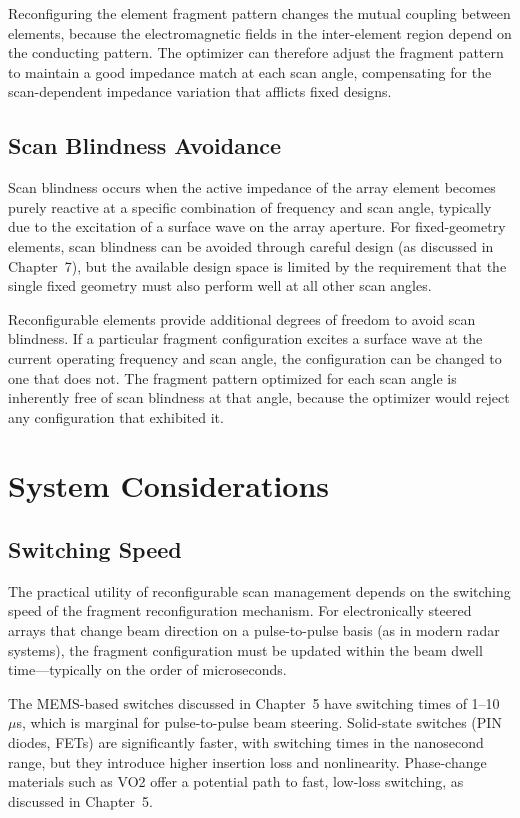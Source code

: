 Reconfiguring the element fragment pattern changes the mutual coupling between elements, because the electromagnetic fields in the inter-element region depend on the conducting pattern.  The optimizer can therefore adjust the fragment pattern to maintain a good impedance match at each scan angle, compensating for the scan-dependent impedance variation that afflicts fixed designs.

\subsection{Scan Blindness Avoidance}

Scan blindness occurs when the active impedance of the array element becomes purely reactive at a specific combination of frequency and scan angle, typically due to the excitation of a surface wave on the array aperture.  For fixed-geometry elements, scan blindness can be avoided through careful design (as discussed in Chapter~7), but the available design space is limited by the requirement that the single fixed geometry must also perform well at all other scan angles.

Reconfigurable elements provide additional degrees of freedom to avoid scan blindness.  If a particular fragment configuration excites a surface wave at the current operating frequency and scan angle, the configuration can be changed to one that does not.  The fragment pattern optimized for each scan angle is inherently free of scan blindness at that angle, because the optimizer would reject any configuration that exhibited it.

\section{System Considerations}

\subsection{Switching Speed}

The practical utility of reconfigurable scan management depends on the switching speed of the fragment reconfiguration mechanism.  For electronically steered arrays that change beam direction on a pulse-to-pulse basis (as in modern radar systems), the fragment configuration must be updated within the beam dwell time---typically on the order of microseconds.

The MEMS-based switches discussed in Chapter~5 have switching times of 1--10~$\mu$s, which is marginal for pulse-to-pulse beam steering.  Solid-state switches (PIN diodes, FETs) are significantly faster, with switching times in the nanosecond range, but they introduce higher insertion loss and nonlinearity.  Phase-change materials such as VO2 offer a potential path to fast, low-loss switching, as discussed in Chapter~5.

